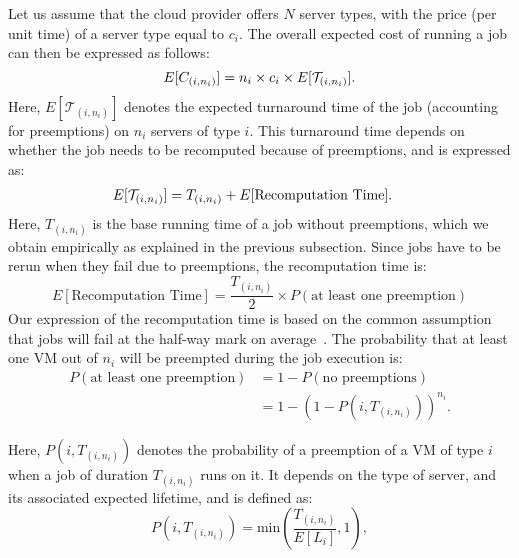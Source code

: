 Let us assume that the cloud provider offers $N$ server types, with the price (per unit time) of a server type equal to $c_i$. 
The overall expected cost of running a job can then be expressed as follows:
\begin{equation}
  \label{eq:e-cost}
\vspace*{\eqnspace}
  E[C_{( i,n_i )}] = n_i\times c_i \times E[\mathcal{T}_{( i,n_i )}].
\end{equation}
Here, $E[\mathcal{T}_{( i,n_i )}]$ denotes the expected turnaround time of the job (accounting for preemptions) on $n_i$ servers of type $i$.
%
This turnaround time depends on whether the job needs to be recomputed because of preemptions, and is expressed as:
\begin{align}
  \label{eq:turnaround}
  \vspace*{\eqnspace}
  E[\mathcal{T}_{( i,n_i )}] &= T_{( i,n_i )} + E[\text{Recomputation Time}].
\end{align}
Here, $T_{( i,n_i )}$ is the base running time of a job without preemptions, which we obtain empirically as explained in the previous subsection.
Since jobs have to be rerun when they fail due to preemptions, the recomputation time is:
\begin{equation}
  \label{eq:recomput}
   E[\text{Recomputation Time}] = \frac{T_{( i,n_i )}}{2} \times P(\text{at least one preemption})
 \end{equation}
 Our expression of the recomputation time is based on the common assumption that jobs will fail at the half-way mark on average~\cite{daly2006higher, bougeret_checkpointing_2011}. 
%
 The probability that at least one VM out of $n_i$ will be preempted during the job execution is:
\begin{align}
  \label{eq:pfail1}
  P(\text{at least one preemption}) &= 1-P(\text{no preemptions}) \\
                                 &= 1-\left(1-P\left(i,T_{(i, n_i)}\right)\right)^{n_i}.
\end{align}

Here, $P(i, T_{(i, n_i)})$ denotes the probability of a preemption of a VM of type $i$ when a job of duration $T_{(i, n_i)}$ runs on it. 
%
It depends on the type of server, and its associated expected lifetime, and is defined as:
\begin{equation}
  \label{eq:pi}
  P\left(i, T_{\left(i, n_i \right)}\right) = \text{min}\left(\dfrac{T_{(i, n_i)}}{E[L_i]}, 1\right),
\end{equation}

